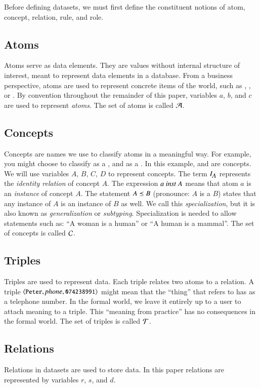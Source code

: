 \documentclass{elsarticle}
\begin{document}
	Before defining datasets, we must first define the constituent notions of atom, concept, relation, rule, and role.
\subsection{Atoms}
	Atoms serve as data elements.
	They are values without internal structure of interest, meant to represent data elements in a database.
	From a business perspective, atoms are used to represent concrete items of the world,
	such as , , or .
	By convention throughout the remainder of this paper, variables $a$, $b$, and $c$ are used to represent \emph{atoms}.
	The set of atoms is called $\mathcal{A}$.
	
\subsection{Concepts}
	Concepts are names we use to classify atoms in a meaningful way.
	For example, you might choose to classify  as a , and  as a .
	In this example,  and  are concepts.
    We will use variables $A$, $B$, $C$, $D$ to represent concepts.
	The term $I_{\text{\it \small A\/}}$ represents the \emph{identity relation} of concept $A$.
	The expression $a\ \text{\it inst\/}\ A$ means that atom $a$ is an \emph{instance} of concept $A$.
	The statement $A\preceq B$ (pronounce: $A$ is a $B$) states that any instance of $A$ is an instance of $B$ as well.
	We call this {\em specialization}, but it is also known as {\em generalization} or {\em subtyping}.
	Specialization is needed to allow statements such as: ``A woman is a human'' or ``A human is a mammal''.
	The set of concepts is called $\mathcal{C}$.
	
\subsection{Triples}
	Triples are used to represent data.
	Each triple relates two atoms to a relation.
	A triple $\langle{\text{{\tt\small Peter}}},{\text{\it phone\/}},{\text{{\tt\small 074238991}}}\rangle$ might mean that the ``thing'' that  refers to
	has  as a telephone number.
	In the formal world, we leave it entirely up to a user to attach meaning to a triple.
	This ``meaning from practice'' has no consequences in the formal world.
	The set of triples is called $\mathcal{T}$.

\subsection{Relations}
	Relations in datasets are used to store data.
	In this paper relations are represented by variables $r$, $s$, and $d$.
\end{document}
